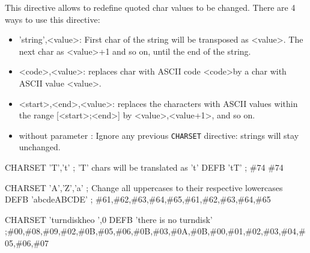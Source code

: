 \begin{xen}
This directive allows to redefine quoted char values to be changed. There are 4 ways to use this directive:

\begin{itemize}
\item 'string',\textless value\textgreater : First char of the string will be transposed as \textless value\textgreater. The next char as \textless value\textgreater+1 and so on, until the end of the string.
\item \textless code\textgreater,\textless value\textgreater : replaces char with ASCII code \textless code\textgreater by a char with ASCII value \textless value\textgreater.
\item \textless start\textgreater,\textless end\textgreater,\textless value\textgreater : replaces the characters with ASCII values within the range [\textless start\textgreater ;\textless end\textgreater] by \textless value\textgreater,\textless value+1\textgreater, and so on.
\item without parameter : Ignore any previous \texttt{CHARSET} directive: strings will stay unchanged.
\end{itemize}
\end{xen}


\begin{code}
CHARSET 'T','t'  ; 'T' chars will be translated as 't'
DEFB 'tT'        ; \#74 \#74
\end{code}


\begin{code}
CHARSET 'A','Z','a' ; Change all uppercases to their respective lowercases
DEFB 'abcdeABCDE'   ; \#61,\#62,\#63,\#64,\#65,\#61,\#62,\#63,\#64,\#65
\end{code}


\begin{code}
CHARSET 'turndiskheo ',0
DEFB 'there is no turndisk'
;\#00,\#08,\#09,\#02,\#0B,\#05,\#06,\#0B,\#03,\#0A,\#0B,\#00,\#01,\#02,\#03,\#04,\#05,\#06,\#07
\end{code}

\subsubsection{}

